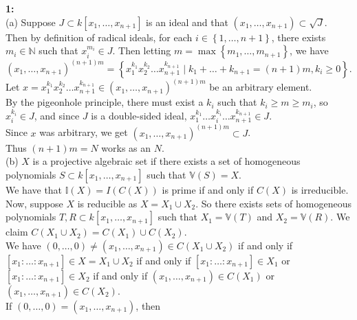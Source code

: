 \documentclass[a4paper]{article}
\begin{document}
    \textbf{1:}\\
    (a) 
    Suppose $J \subset k\left[ x_1, \ldots, x_{n+1} \right] $ is an ideal
    and that $\left( x_1, \ldots, x_{n+1} \right) 
    \subset \sqrt{J} $. Then by definition of radical ideals,
    for each $i \in \left\{ 1, \ldots, n+1 \right\} $,
    there exists $m_i \in \mathbb{N}$ such that
    $x_{i}^{m_i} \in J$. Then letting $m = \max \left\{ m_1, \ldots, m_{n+1}
    \right\} $, we have
    \[
        \left( x_1 , \ldots, x_{n+1} \right)^{(n+1)m}
        = \left\{ x_1^{k_1} x_2^{k_2}\ldots x_{n+1}^{k_{n+1}} \mid 
        k_1 + \ldots + k_{n+1} = (n+1)m,
    k_i \ge 0\right\}.
    \] 
    Let
    $x = x_1^{k_1} x_2^{k_2} \ldots x_{n+1}^{k_{n+1}} \in 
    \left( x_1, \ldots, x_{n+1} \right)^{(n+1)m}$ be an arbitrary element.\\
    By the pigeonhole principle, there must exist a 
    $k_i$ such that $k_i \ge m \ge m_i$, so
    $x_i^{k_i} \in J$, and since $J$ is a double-sided ideal,
    $x_1^{k_1}\ldots x_i^{k_i} \ldots x_{n+1}^{k_{n+1}} \in J$.\\
    Since $x$ was arbitrary, we get
    $(x_1, \ldots, x_{n+1})^{(n+1)m} \subset J$.\\
    Thus $(n+1)m = N$ works as an  $N$.\\
    \linebreak
    (b) $X$ is a projective algebraic set if
    there exists a set of homogeneous polynomials $S \subset k\left[ x_1,
    \ldots, x_{n+1} \right] $ such that
    $\mathbb{V}(S) = X$.\\
    \linebreak
    We have that
    $\mathbb{I} (X) = I\left( C(X) \right) $ is prime if
    and only if $C(X)$ is irreducible. Now, suppose $X$ is reducible as
    $X = X_1 \cup X_2$. So there
    exists sets of homogeneous polynomials
    $T,R \subset k\left[ x_1,\ldots, x_{n+1} \right] $ such that
    $X_1 = \mathbb{V}(T)$ and $X_2 = \mathbb{V}(R)$. We claim
    $C(X_1 \cup X_2) = C(X_1) \cup C(X_2)$.\\
    \linebreak
    We have $ (0,\ldots, 0) \neq (x_1, \ldots, x_{n+1}) \in C(X_1 \cup X_2)$ if
    and only if
    $\left[ x_1  : \ldots : x_{n+1} \right] \in X = X_1 \cup X_2$ if and only
    if
    $\left[ x_1 : \ldots : x_{n+1} \right] \in X_1$
    or $\left[ x_1 : \ldots : x_{n+1} \right] \in X_2$ if and only if
    $(x_1, \ldots, x_{n+1}) \in C(X_1)$ or
    $(x_1 ,\ldots, x_{n+1}) \in C(X_2)$.\\
    If $(0,\ldots,0) = (x_1, \ldots, x_{n+1})$, then
\end{document}
